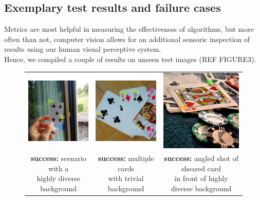 \documentclass[a4paper]{article}
\begin{document}
\subsection*{Exemplary test results and failure cases}
Metrics are most helpful in measuring the effectiveness of algorithms, but more often than not, computer vision allows for an additional sensoric inspection of results using our human visual perceptive system. \\Hence, we compiled a couple of results on unseen test images (REF FIGURE3).
\begin{figure}[h]

\begin{tabular}{ccc}

 \includegraphics[width=44mm]{success3} &   \includegraphics[width=44mm]{success2} &   \includegraphics[width=44mm]{success1}\\
\makecell{\textbf{success:} scenario with a \\ highly diverse background}  & \makecell{\textbf{success:}  multiple cards \\ with trivial background} & \makecell{\textbf{success:}  angled shot of sheared card \\ in front of highly diverse background}\\[6pt]

\end{tabular}
\end{figure}
\end{document}
